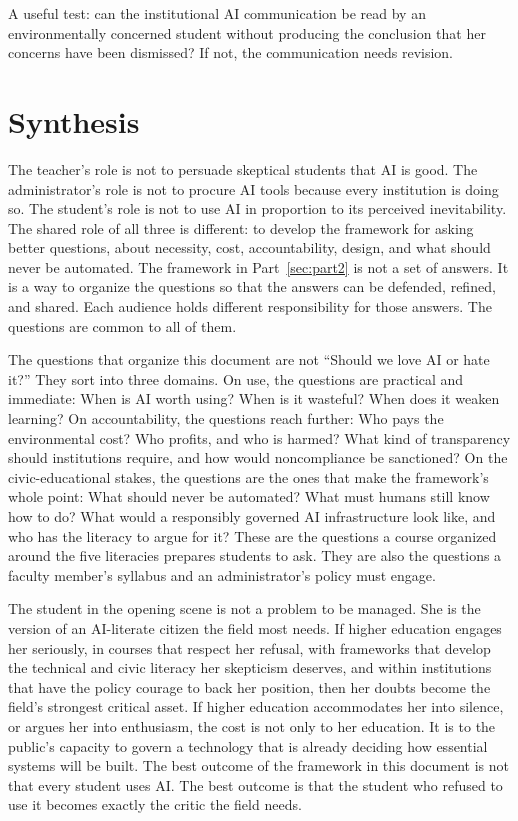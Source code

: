 \documentclass[12pt]{article}
\begin{document}
A useful test: can the institutional AI communication be read by an environmentally concerned student without producing the conclusion that her concerns have been dismissed? If not, the communication needs revision.

\section{Synthesis}
\label{sec:part4}

The teacher's role is not to persuade skeptical students that AI is good. The administrator's role is not to procure AI tools because every institution is doing so. The student's role is not to use AI in proportion to its perceived inevitability. The shared role of all three is different: to develop the framework for asking better questions, about necessity, cost, accountability, design, and what should never be automated. The framework in Part~\ref{sec:part2} is not a set of answers. It is a way to organize the questions so that the answers can be defended, refined, and shared. Each audience holds different responsibility for those answers. The questions are common to all of them.

The questions that organize this document are not ``Should we love AI or hate it?'' They sort into three domains. On use, the questions are practical and immediate: When is AI worth using? When is it wasteful? When does it weaken learning? On accountability, the questions reach further: Who pays the environmental cost? Who profits, and who is harmed? What kind of transparency should institutions require, and how would noncompliance be sanctioned? On the civic-educational stakes, the questions are the ones that make the framework's whole point: What should never be automated? What must humans still know how to do? What would a responsibly governed AI infrastructure look like, and who has the literacy to argue for it? These are the questions a course organized around the five literacies prepares students to ask. They are also the questions a faculty member's syllabus and an administrator's policy must engage.

The student in the opening scene is not a problem to be managed. She is the version of an AI-literate citizen the field most needs. If higher education engages her seriously, in courses that respect her refusal, with frameworks that develop the technical and civic literacy her skepticism deserves, and within institutions that have the policy courage to back her position, then her doubts become the field's strongest critical asset. If higher education accommodates her into silence, or argues her into enthusiasm, the cost is not only to her education. It is to the public's capacity to govern a technology that is already deciding how essential systems will be built. The best outcome of the framework in this document is not that every student uses AI. The best outcome is that the student who refused to use it becomes exactly the critic the field needs.

\printbibliography[title=References]
\end{document}
